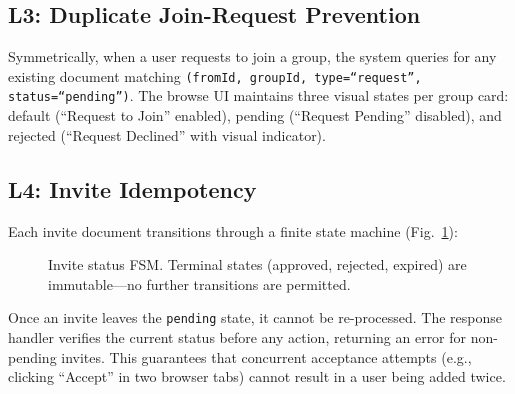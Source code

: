 \documentclass[11pt,a4paper]{article}
\theoremstyle{plain}
\theoremstyle{definition}
\begin{document}
\subsection{L3: Duplicate Join-Request Prevention}

Symmetrically, when a user requests to join a group, the system queries for any existing document matching \texttt{(fromId, groupId, type=``request'', status=``pending'')}. The browse UI maintains three visual states per group card: default (``Request to Join'' enabled), pending (``Request Pending'' disabled), and rejected (``Request Declined'' with visual indicator).

\subsection{L4: Invite Idempotency}

Each invite document transitions through a finite state machine (Fig.~\ref{fig:invitefsm}):

\begin{figure}[htbp]
\centering
{}
\caption{Invite status FSM. Terminal states (approved, rejected, expired) are immutable---no further transitions are permitted.}
\label{fig:invitefsm}
\end{figure}

Once an invite leaves the \texttt{pending} state, it cannot be re-processed. The response handler verifies the current status before any action, returning an error for non-pending invites. This guarantees that concurrent acceptance attempts (e.g., clicking ``Accept'' in two browser tabs) cannot result in a user being added twice.
\end{document}
